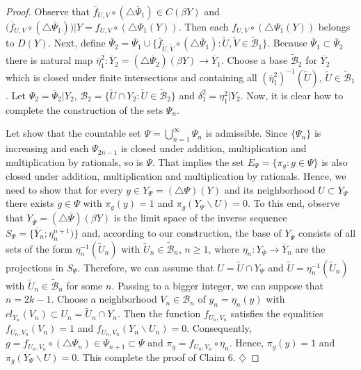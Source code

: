\documentclass[12pt]{amsart}
\begin{document}
\begin{proof}
Observe that $\overline f_{U,V}\circ(\triangle\overline\Psi_{1})\in C(\beta Y)$ and $\big(\overline f_{U,V}\circ(\triangle\overline\Psi_{1})\big)|Y=f_{U,V}\circ(\triangle\Psi_{1}(Y))$. Then
each $f_{U,V}\circ(\triangle\Psi_{1}(Y))$ belongs to $D(Y)$. Next, define $\overline\Psi_2=\overline\Psi_1\cup\{\overline f_{\widetilde U,\widetilde V}\circ(\triangle\overline\Psi_{1}):\widetilde U,\widetilde V\in\widetilde{\mathcal B}_1\}$. Because $\overline \Psi_1\subset\overline\Psi_2$ there is natural map $\overline\eta^2_1:\overline Y_2=(\triangle\overline\Psi_2)(\beta Y)\to \overline Y_1$. Choose a base $\widetilde{\mathcal B}_2$ for $\overline Y_2$ which is closed under finite intersections and containing all 
$(\overline\eta^2_1)^{-1}(\widetilde U)$, $\widetilde U\in\widetilde{\mathcal B}_1$. Let $\Psi_2=\overline\Psi_2|Y_2$, $\mathcal B_2=\{\widetilde U\cap Y_2:\widetilde U\in\widetilde{\mathcal B}_2\}$ and $\delta^2_1=\eta^2_1|Y_2$.
Now, it is clear how to complete the construction of the sets $\Psi_n$. 

Let show that the countable set 
$\Psi=\bigcup_{n=1}^\infty\Psi_n$ is admissible. Since $\{\Psi_n\}$ is increasing and each $\Psi_{2n-1}$ is closed under addition, multiplication and 
multiplication by rationals, so is $\Psi$. That implies the set $E_\Psi=\{\pi_g:g\in\Psi\}$ is also closed under addition, multiplication and multiplication by rationals. Hence, we need to show that for every $y\in Y_\Psi=(\triangle\Psi)(Y)$ and its neighborhood $U\subset Y_\Psi$ there exists $g\in\Psi$ with
$\pi_g(y)=1$ and $\pi_g(Y_\Psi\backslash U)=0$. To this end, observe that $Y_{\overline\Psi}=(\triangle\overline\Psi)(\beta Y)$ is the limit space of the inverse sequence
$S_\Psi=\{\overline Y_n;\eta^{n+1}_n)\}$ and, according to our construction, the base of $Y_{\overline\Psi}$ consists of all sets of the form $\eta_n^{-1}(\widetilde U_n)$ with $\widetilde U_n\in\widetilde{\mathcal B}_n$, $n\geq 1$, where 
$\eta_n:Y_{\overline\Psi}\to\overline Y_n$ are the projections in $S_\Psi$. Therefore, we can assume that $U=\widetilde U\cap Y_\Psi$ and $\widetilde U=\eta_n^{-1}(\widetilde U_n)$ with $\widetilde U_n\in\widetilde{\mathcal B}_n$ for some $n$. Passing to a bigger integer, we can suppose that $n=2k-1$. Choose a neighborhood $V_n\in\mathcal B_n$ of $y_n=\eta_n(y)$ with $cl_{Y_n}(V_n)\subset U_n=\widetilde U_n\cap Y_n$. Then the function $f_{U_n,V_n}$ satisfies the equalities $f_{U_n,V_n}(V_n)=1$ and $f_{U_n,V_n}(Y_n\backslash U_n)=0$. Consequently, $g=f_{U_n,V_n}\circ(\triangle\Psi_{n})\in\Psi_{n+1}\subset\Psi$ and $\pi_g=f_{U_n,V_n}\circ\eta_n$. 
Hence, $\pi_g(y)=1$ and $\pi_g(Y_\Psi\backslash U)=0$. This complete the proof of Claim 6. $\diamondsuit$




\end{proof}
\end{document}
